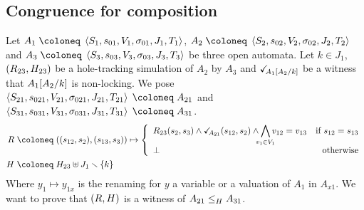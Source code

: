 \documentclass{article}
\begin{document}
\subsection{Congruence for composition}\label{apx:cong}
Let \(A_1 \defobject \OAg[1]\), \(A_2 \defobject \OAg[2]\) and \(A_3 \defobject \OAg[3]\) be three open automata.
Let \(k \in J_1\), \(\mpar{R_{23}, H_{23}}\) be a hole-tracking simulation of \(A_2\) by \(A_3\) and \(\reach{A_1\subst{A_2}{k}}\) be a witness that \(A_1\subst{A_2}{k}\) is non-locking.
We pose \(\OAg[21] \defobject A_{21}\) and \(\OAg[31] \defobject A_{31}\).
\begin{align*}
	R \defobject & \mpar{\mpar{s_{12}, s_2}, \mpar{s_{13}, s_3}} \mapsto \choice{R_{23}\mpar{s_2, s_3} \wedge \reach{A_{21}}\mpar{s_{12}, s_2} \wedge \bigwedge_\subbox{v_1 \in V_1} v_{12} = v_{13} & \text{if } s_{12} = s_{13} \\ \bot & \text{otherwise}} \\
	H \defobject & H_{23} \uplus J_1 \setminus \mbrc{k}
\end{align*}
Where \(y_1 \mapsto y_{1x}\) is the renaming for \(y\) a variable or a valuation of \(A_1\) in \(A_{x1}\).
We want to prove that \(\mpar{R, H}\) is a witness of \(\wrel{A_{21}}{A_{31}}{H}\).
\end{document}

